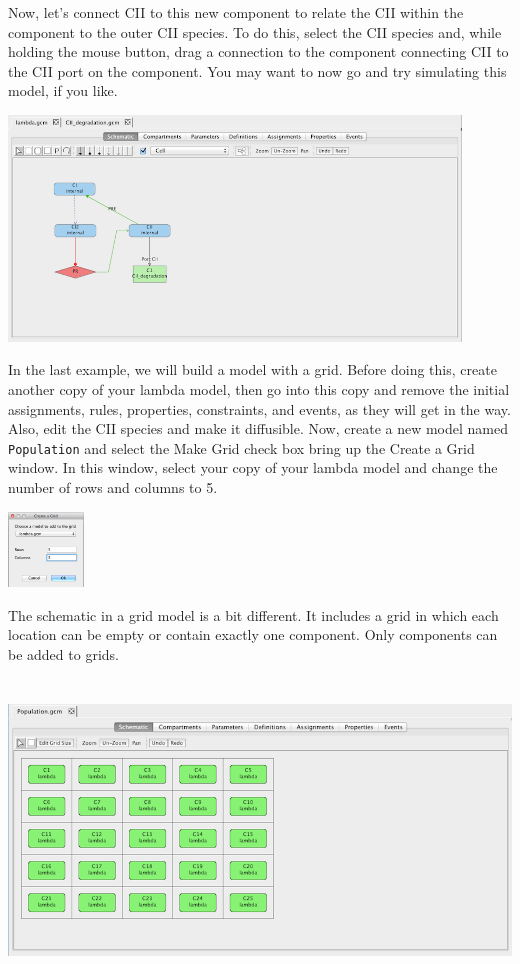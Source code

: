 \documentclass[titlepage,11pt]{article}
\begin{document}
Now, let's connect CII to this new component to relate the CII within the component to the outer CII species.  To do this, select the CII species and, while holding the mouse button, drag a connection to the component connecting CII to the CII port on the component.  
You may want to now go and try simulating this model, if you like.

\begin{center}
\includegraphics[height=60mm]{screenshots/addPort}
\end{center}

In the last example, we will build a model with a grid.  Before doing this, create another copy of your lambda model, then go into this copy and remove the initial assignments, rules, properties, constraints, and events, as they will get in the way.  Also, edit the CII species and make it diffusible.  Now, create a new model named {\tt Population} and select the Make Grid check box bring up the Create a Grid window.  In this window, select your copy of your lambda model and change the number of rows and columns to 5.  

\begin{center}
\includegraphics[height=20mm]{screenshots/createGrid}
\end{center}

The schematic in a grid model is a bit different.  It includes a grid in which each location can be empty or contain exactly one component.  Only components can be added to grids.

\begin{center}
\includegraphics[height=80mm]{screenshots/gridModel}
\end{center}
\end{document}
